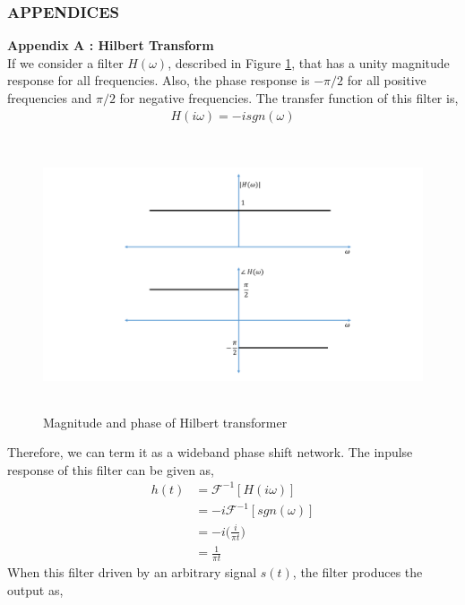 \subsubsection{\textbf{APPENDICES}}
\textbf{Appendix A : Hilbert Transform}\\
If we consider a filter $H(\omega)$, described in Figure \ref{Hilbert_Transformer}, that has a unity magnitude response for all frequencies. Also, the phase response is $-\pi/2$ for all positive frequencies and $\pi/2$ for negative frequencies. The transfer function of this filter is,
\begin{equation}
\begin{split}
H(i\omega)=-isgn(\omega)
\end{split}
\label{}
\end{equation}
\begin{figure}[h]
	\centering
	\includegraphics[width=1.0\textwidth, height=8cm]{./sdf/simplified_coherent_receiver/figures/HT.pdf}
	\caption{Magnitude and phase of Hilbert transformer}\label{Hilbert_Transformer}
\end{figure}
Therefore, we can term it as a wideband phase shift network. The inpulse response of this filter can be given as,
\begin{equation}
\begin{split}
h(t)&=\mathcal{F}^{-1}[H(i\omega)]\\
	&=-i\mathcal{F}^{-1}[sgn(\omega)]\\
	&=-i\bigg(\frac{i}{\pi t}\bigg)\\
	&=\frac{1}{\pi t}
\end{split}
\label{}
\end{equation}
When this filter driven by an arbitrary signal $s(t)$, the filter produces the output as,
